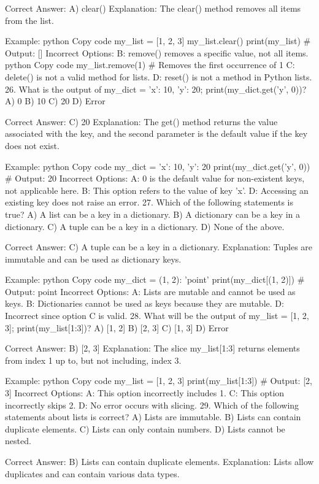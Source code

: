 Correct Answer: A) clear()
Explanation: The clear() method removes all items from the list.

Example:
python
Copy code
my_list = [1, 2, 3]
my_list.clear()
print(my_list)  # Output: []
Incorrect Options:
B: remove() removes a specific value, not all items.
python
Copy code
my_list.remove(1)  # Removes the first occurrence of 1
C: delete() is not a valid method for lists.
D: reset() is not a method in Python lists.
26. What is the output of my_dict = {'x': 10, 'y': 20}; print(my_dict.get('y', 0))?
A) 0
B) 10
C) 20
D) Error

Correct Answer: C) 20
Explanation: The get() method returns the value associated with the key, and the second parameter is the default value if the key does not exist.

Example:
python
Copy code
my_dict = {'x': 10, 'y': 20}
print(my_dict.get('y', 0))  # Output: 20
Incorrect Options:
A: 0 is the default value for non-existent keys, not applicable here.
B: This option refers to the value of key 'x'.
D: Accessing an existing key does not raise an error.
27. Which of the following statements is true?
A) A list can be a key in a dictionary.
B) A dictionary can be a key in a dictionary.
C) A tuple can be a key in a dictionary.
D) None of the above.

Correct Answer: C) A tuple can be a key in a dictionary.
Explanation: Tuples are immutable and can be used as dictionary keys.

Example:
python
Copy code
my_dict = {(1, 2): 'point'}
print(my_dict[(1, 2)])  # Output: point
Incorrect Options:
A: Lists are mutable and cannot be used as keys.
B: Dictionaries cannot be used as keys because they are mutable.
D: Incorrect since option C is valid.
28. What will be the output of my_list = [1, 2, 3]; print(my_list[1:3])?
A) [1, 2]
B) [2, 3]
C) [1, 3]
D) Error

Correct Answer: B) [2, 3]
Explanation: The slice my_list[1:3] returns elements from index 1 up to, but not including, index 3.

Example:
python
Copy code
my_list = [1, 2, 3]
print(my_list[1:3])  # Output: [2, 3]
Incorrect Options:
A: This option incorrectly includes 1.
C: This option incorrectly skips 2.
D: No error occurs with slicing.
29. Which of the following statements about lists is correct?
A) Lists are immutable.
B) Lists can contain duplicate elements.
C) Lists can only contain numbers.
D) Lists cannot be nested.

Correct Answer: B) Lists can contain duplicate elements.
Explanation: Lists allow duplicates and can contain various data types.

